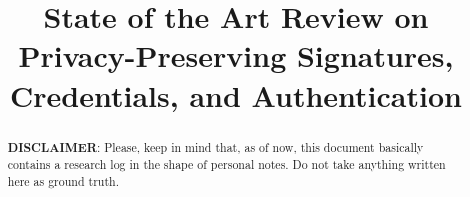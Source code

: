 \documentclass{llncs}%
\title{State of the Art Review on Privacy-Preserving Signatures, Credentials, and Authentication}
\author{}
\begin{document}
\maketitle


\begin{abstract}
	\textbf{DISCLAIMER}: Please, keep in mind that, as of now, this document
	basically contains a research log in the shape of personal notes. Do not take 
	anything written here as ground truth.
\end{abstract}












\end{document}
